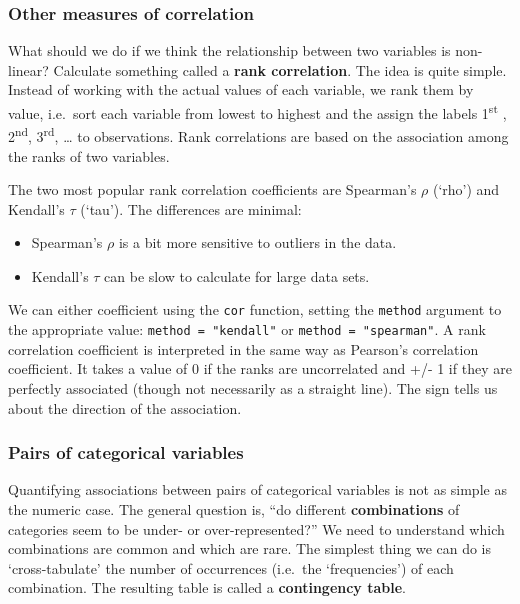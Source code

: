 \documentclass[
]{book}
\providecommand{\tightlist}{%
  \setlength{\itemsep}{0pt}\setlength{\parskip}{0pt}}
\newenvironment{greybox}{
  \definecolor{shadecolor}{rgb}{0.95,0.95,0.95}  %
  \color{black}
  \begin{shaded}}
 {\end{shaded}}
\newenvironment{infobox}[1]
  {
  \begin{itemize}
  \renewcommand{\labelitemi}{
    \raisebox{-.7\height}[0pt][0pt]{
      {\setkeys{Gin}{width=3em,keepaspectratio}
        \texttt{[image: images/\#1]}}
    }
  }
  \setlength{\fboxsep}{1em}
  \begin{greybox}
  \item
  }
  {
  \end{greybox}
  \end{itemize}
  }
\begin{document}
\begin{infobox}{warning}

\hypertarget{other-measures-of-correlation}{%
\subsubsection*{Other measures of correlation}\label{other-measures-of-correlation}}

What should we do if we think the relationship between two variables is non-linear? Calculate something called a \textbf{rank correlation}. The idea is quite simple. Instead of working with the actual values of each variable, we rank them by value, i.e.~sort each variable from lowest to highest and the assign the labels 1\textsuperscript{st} , 2\textsuperscript{nd}, 3\textsuperscript{rd}, \ldots{} to observations. Rank correlations are based on the association among the ranks of two variables.

The two most popular rank correlation coefficients are Spearman's \(\rho\) (`rho') and Kendall's \(\tau\) (`tau'). The differences are minimal:

\begin{itemize}
\tightlist
\item
  Spearman's \(\rho\) is a bit more sensitive to outliers in the data.
\item
  Kendall's \(\tau\) can be slow to calculate for large data sets.
\end{itemize}

We can either coefficient using the \texttt{cor} function, setting the \texttt{method} argument to the appropriate value: \texttt{method\ =\ "kendall"} or \texttt{method\ =\ "spearman"}. A rank correlation coefficient is interpreted in the same way as Pearson's correlation coefficient. It takes a value of 0 if the ranks are uncorrelated and +/- 1 if they are perfectly associated (though not necessarily as a straight line). The sign tells us about the direction of the association.

\end{infobox}

\hypertarget{pairs-of-categorical-variables}{%
\subsubsection{Pairs of categorical variables}\label{pairs-of-categorical-variables}}

Quantifying associations between pairs of categorical variables is not as simple as the numeric case. The general question is, ``do different \textbf{combinations} of categories seem to be under- or over-represented?'' We need to understand which combinations are common and which are rare. The simplest thing we can do is `cross-tabulate' the number of occurrences (i.e.~the `frequencies') of each combination. The resulting table is called a \textbf{contingency table}.
\end{document}
